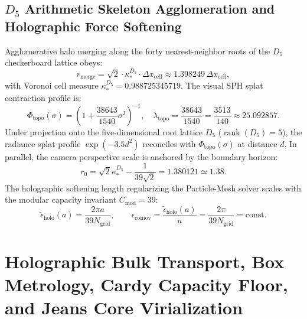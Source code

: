 \documentclass[11pt]{article}
\theoremstyle{plain}
\begin{document}
\subsection{\texorpdfstring{$D_5$}{D5} Arithmetic Skeleton Agglomeration and Holographic Force Softening}
Agglomerative halo merging along the forty nearest-neighbor roots of the $D_5$ checkerboard lattice obeys:
\begin{equation}
r_{\mathrm{merge}} = \sqrt{2} \cdot \kappa_*^{D_5} \cdot \Delta x_{\mathrm{cell}} \approx 1.398249 \, \Delta x_{\mathrm{cell}},
\end{equation}
with Voronoi cell measure $\kappa_*^{D_5} = 0.988725345719$. The visual SPH splat contraction profile is:
\begin{equation}
\Phi_{\mathrm{topo}}(\sigma) = \left( 1 + \frac{38643}{1540} \sigma^2 \right)^{-1}, \quad \lambda_{\mathrm{topo}} = \frac{38643}{1540} = \frac{3513}{140} \approx 25.092857.
\end{equation}
Under projection onto the five-dimensional root lattice $D_5$ ($\operatorname{rank}(D_5) = 5$), the radiance splat profile $\exp(-3.5 d^2)$ reconciles with $\Phi_{\mathrm{topo}}(\sigma)$ at distance $d$. In parallel, the camera perspective scale is anchored by the boundary horizon:
\begin{equation}
r_0 = \sqrt{2}\kappa_*^{D_5} - \frac{1}{39\sqrt{2}} = 1.380121 \simeq 1.38.
\end{equation}
The holographic softening length regularizing the Particle-Mesh solver scales with the modular capacity invariant $C_{\mathrm{mod}} = 39$:
\begin{equation}
\tilde{\epsilon}_{\mathrm{holo}}(a) = \frac{2\pi a}{39 N_{\mathrm{grid}}}, \qquad \epsilon_{\mathrm{comov}} = \frac{\tilde{\epsilon}_{\mathrm{holo}}(a)}{a} = \frac{2\pi}{39 N_{\mathrm{grid}}} = \text{const}.
\end{equation}

\section{Holographic Bulk Transport, Box Metrology, Cardy Capacity Floor, and Jeans Core Virialization}
\label{app:precision-bulk-transport-initial-conditions}
\end{document}
